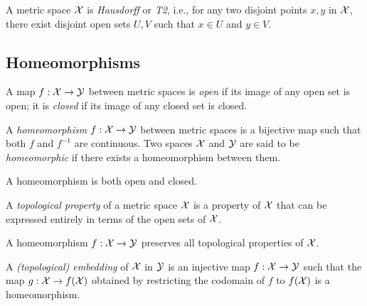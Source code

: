 \begin{coro}
  \label{coro:metricSpaceIsT2}
  A metric space ${\cal X}$ is \emph{Hausdorff} or \emph{T2},
  i.e., 
  for any two disjoint points $x,y$ in ${\cal X}$,
  there exist disjoint open sets $U,V$
  such that $x\in U$ and $y\in V$.
\end{coro}

\subsection{Homeomorphisms}
\label{sec:homeomorphisms}

\begin{defn}
  \label{def:openMap}
  A map $f:{\cal X}\rightarrow {\cal Y}$ between metric spaces is \emph{open}
  if its image of any open set is open; 
  it is \emph{closed} if its image of any closed set is closed. 
\end{defn}

\begin{defn}
  A \emph{homeomorphism} $f:{\cal X}\rightarrow {\cal Y}$
  between metric spaces
  is a bijective map such that both $f$ and $f^{-1}$
  are continuous.
  Two spaces ${\cal X}$ and ${\cal Y}$
  are said to be \emph{homeomorphic}
  if there exists a homeomorphism between them.
\end{defn}

\begin{lem}
  \label{lem:homeomorphismIsOpenAndClosed}
  A homeomorphism is both open and closed.
\end{lem}

\begin{defn}
  \label{def:topologicalProperty}
  A \emph{topological property} of a metric space ${\cal X}$
  is a property of ${\cal X}$
  that can be expressed entirely in terms of
  the open sets of ${\cal X}$.
\end{defn}

\begin{coro}
  A homeomorphism $f:{\cal X}\rightarrow {\cal Y}$
  preserves all topological properties of ${\cal X}$. 
\end{coro}

\begin{defn}
  \label{def:topoEmbedding}
  A \emph{(topological) embedding} of ${\cal X}$ in ${\cal Y}$
  is an injective map $f:{\cal X}\rightarrow{\cal Y}$
  such that the map $g:{\cal X}\rightarrow f({\cal X})$
  obtained by restricting the codomain of $f$ to $f({\cal X})$
  is a homeomorphism.
\end{defn}


